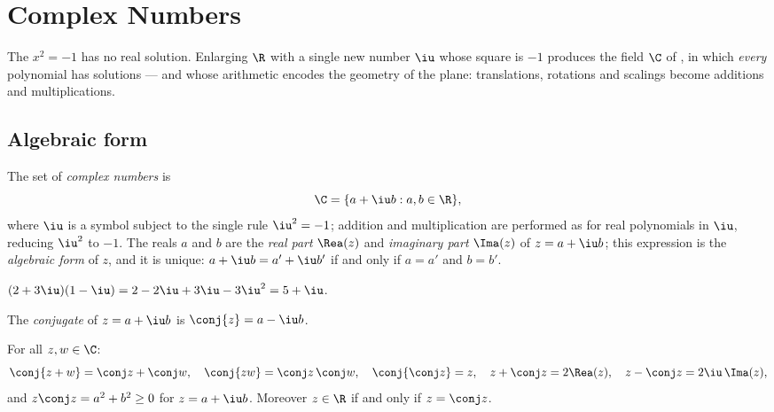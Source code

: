 \chapter{Complex Numbers}\label{ch:g12:complex}

The  $x^2 = -1$ has no real solution. Enlarging $\R$ with a single
new number $\iu$ whose square is $-1$ produces the field $\C$ of , in which \emph{every} polynomial  has solutions --- and
whose arithmetic encodes the geometry of the plane: translations, rotations
and scalings become additions and multiplications.

\section{Algebraic form}

\begin{definition}\label{def:g12:complex:def}
The set of \emph{complex numbers} is
\[
\C = \{a + \iu b : a, b \in \R\},
\]
where $\iu$ is a symbol subject to the single rule $\iu^2 = -1$; addition and
multiplication are performed as for real polynomials in $\iu$, reducing
$\iu^2$ to $-1$. The reals $a$ and $b$ are the \emph{real part}
$\Rea(z)$ and \emph{imaginary part} $\Ima(z)$ of $z = a + \iu b$; this
expression is the \emph{algebraic form} of $z$, and it is unique:
$a + \iu b = a' + \iu b'$ if and only if $a = a'$ and $b = b'$.
\end{definition}

\begin{example}
$(2 + 3\iu)(1 - \iu) = 2 - 2\iu + 3\iu - 3\iu^2 = 5 + \iu$.
\end{example}

\begin{definition}[Conjugate]\label{def:g12:complex:conjugate}
The \emph{conjugate} of $z = a + \iu b$ is
$\conj{z} = a - \iu b$.
\end{definition}

\begin{proposition}\label{prop:g12:complex:conjugate}
For all $z, w \in \C$:
\[
\conj{z + w} = \conj z + \conj w, \quad
\conj{zw} = \conj z\,\conj w, \quad
\conj{\conj z} = z, \quad
z + \conj z = 2\Rea(z), \quad
z - \conj z = 2\iu\,\Ima(z),
\]
and $z\conj z = a^2 + b^2 \geq 0$ for $z = a + \iu b$. Moreover $z \in \R$
if and only if $z = \conj z$.
\end{proposition}

